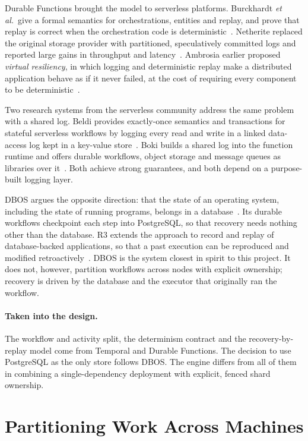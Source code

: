 Durable Functions brought the model to serverless platforms. Burckhardt
\emph{et al.}\ give a formal semantics for orchestrations, entities and
replay, and prove that replay is correct when the orchestration code is
deterministic~\cite{durablefunctions2021}. Netherite replaced the original
storage provider with partitioned, speculatively committed logs and reported
large gains in throughput and latency~\cite{netherite2022}. Ambrosia earlier
proposed \emph{virtual resiliency}, in which logging and deterministic replay
make a distributed application behave as if it never failed, at the cost of
requiring every component to be deterministic~\cite{ambrosia2020}.

Two research systems from the serverless community address the same problem
with a shared log. Beldi provides exactly-once semantics and transactions for
stateful serverless workflows by logging every read and write in a linked
data-access log kept in a key-value store~\cite{beldi2020}. Boki builds a
shared log into the function runtime and offers durable workflows, object
storage and message queues as libraries over it~\cite{boki2021}. Both achieve
strong guarantees, and both depend on a purpose-built logging layer.

DBOS argues the opposite direction: that the state of an operating system,
including the state of running programs, belongs in a database~\cite{dbos2022}.
Its durable workflows checkpoint each step into PostgreSQL, so that recovery
needs nothing other than the database. R3 extends the approach to record and
replay of database-backed applications, so that a past execution can be
reproduced and modified retroactively~\cite{r3vldb2023}. DBOS is the system
closest in spirit to this project. It does not, however, partition workflows
across nodes with explicit ownership; recovery is driven by the database and
the executor that originally ran the workflow.

\paragraph{Taken into the design.} The workflow and activity split, the
determinism contract and the recovery-by-replay model come from Temporal and
Durable Functions. The decision to use PostgreSQL as the only store follows
DBOS. The engine differs from all of them in combining a single-dependency
deployment with explicit, fenced shard ownership.

\section{Partitioning Work Across Machines}

